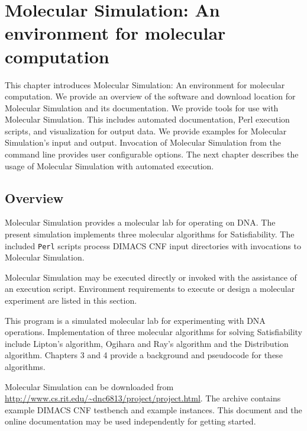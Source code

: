 \chapter{Molecular Simulation: An environment for molecular computation}


This chapter introduces Molecular Simulation: An environment for molecular computation.  We provide an overview of the software and download location for Molecular Simulation and its documentation. We provide tools for use with Molecular Simulation.  This includes automated documentation, Perl execution scripts, and visualization for output data.  We provide examples for Molecular Simulation's input and output.  Invocation of Molecular Simulation from the command line provides user configurable options.  The next chapter describes the usage of Molecular Simulation with automated execution.
	
	\section{Overview}
	

Molecular Simulation provides a molecular lab for operating on DNA.  The present simulation implements three molecular algorithms for {\sc Satisfiability}.  The included \texttt{Perl} scripts process DIMACS CNF input directories with invocations to Molecular Simulation.

Molecular Simulation may be executed directly or invoked with the assistance of an execution script.  Environment requirements to execute or design a molecular experiment are listed in this section.  
		
This program is a simulated molecular lab for experimenting with DNA operations. Implementation of three molecular algorithms for solving {\sc Satisfiability} include Lipton's algorithm, Ogihara and Ray's algorithm and the Distribution algorithm.  Chapters 3 and 4 provide a background and pseudocode for these algorithms.		

Molecular Simulation can be downloaded from \url{http://www.cs.rit.edu/~dnc6813/project/project.html}.  The archive contains example DIMACS CNF testbench and example instances.  This document and the online documentation may be used independently for getting started.

